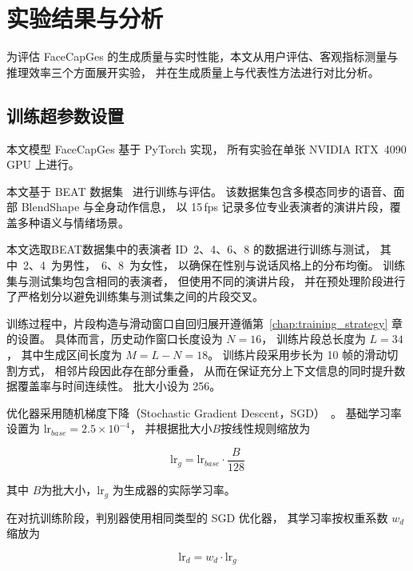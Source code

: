 
\chapter{实验结果与分析}
\label{chap:evaluation}

为评估 FaceCapGes 的生成质量与实时性能，本文从用户评估、客观指标测量与推理效率三个方面展开实验，
并在生成质量上与代表性方法进行对比分析。

\section{训练超参数设置}
\label{sec:implementation}

本文模型 FaceCapGes 基于 PyTorch 实现，
所有实验在单张 NVIDIA RTX~4090 GPU 上进行。

本文基于 BEAT 数据集~\cite{beatcamn} 进行训练与评估。
该数据集包含多模态同步的语音、面部 BlendShape 与全身动作信息，
以 15\,fps 记录多位专业表演者的演讲片段，覆盖多种语义与情绪场景。

本文选取BEAT数据集中的表演者 ID~2、4、6、8 的数据进行训练与测试，
其中~2、4~为男性，~6、8~为女性，
以确保在性别与说话风格上的分布均衡。
训练集与测试集均包含相同的表演者，
但使用不同的演讲片段，
并在预处理阶段进行了严格划分以避免训练集与测试集之间的片段交叉。

训练过程中，片段构造与滑动窗口自回归展开遵循第~\ref{chap:training_strategy} 章的设置。
具体而言，历史动作窗口长度设为 $N=16$，
训练片段总长度为 $L=34$，
其中生成区间长度为 $M=L-N=18$。
训练片段采用步长为 10 帧的滑动切割方式，
相邻片段因此存在部分重叠，
从而在保证充分上下文信息的同时提升数据覆盖率与时间连续性。
批大小设为 256。

优化器采用随机梯度下降（Stochastic Gradient Descent，SGD）~\cite{SGDBottou2010LargeScaleML}。
基础学习率设置为 $\mathrm{lr}_{base}=2.5\times10^{-4}$，
并根据批大小$B$按线性规则缩放为

\begin{equation}
\mathrm{lr}_{g} = \mathrm{lr}_{base}\cdot \frac{B}{128}
\end{equation}

其中 $B$为批大小，$\mathrm{lr}_{g}$ 为生成器的实际学习率。

在对抗训练阶段，判别器使用相同类型的 SGD 优化器，
其学习率按权重系数 $w_d$ 缩放为

\begin{equation}
\mathrm{lr}_{d} = w_d \cdot \mathrm{lr}_{g}
\end{equation}

